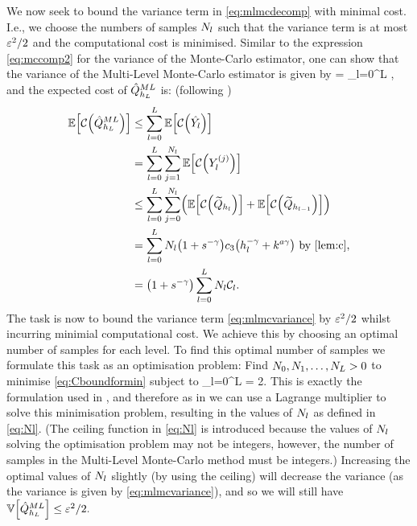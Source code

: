 We now seek to bound the variance term in \cref{eq:mlmcdecomp} with minimal cost. I.e., we choose the numbers of samples $N_{l}$ such that the variance term is at most $\varepsilon^2/2$ and the computational cost is minimised. Similar to the expression \cref{eq:mccomp2} for the variance of the Monte-Carlo estimator, one can show that the variance of the Multi-Level Monte-Carlo estimator is given by
\beq\label{eq:mlmcvariance}
\VAR{\QhatMLhL} = \sum_{l=0}^L \frac{\Vl}{\Nl},
\eeq
and the expected cost of $\hat{Q}^{ML}_{h_{L}}$ is: (following \cite{GrPaSc:19})
\begin{align}
\EXP{\Cost{\QhatMLhL}}&\leq \sum_{l=0}^L \EXP{\Cost{\Ylhat}}\nonumber\\
&= \sum_{l=0}^L \sum_{j=1}^{\Nl} \EXP{\Cost{\Ylj}}\nonumber\\
&\leq \sum_{l=0}^L \sum_{j=0}^{\Nl} \mleft(\EXP{\Cost{\Qhltilde}} + \EXP{\Cost{\Qhlmotilde}}\mright)\nonumber\\
&=\sum_{l=0}^L \Nl\mleft(1+s^{-\gamma}\mright) \cth \mleft(\hl^{-\gamma}+k^{a\gamma}\mright) \text{ by \cref{lem:c},}\nonumber\\
&= \mleft(1+s^{-\gamma}\mright) \sum_{l=0}^L \Nl\Cl.\label{eq:Cboundformin}
\end{align}
The task is now to bound the variance term \cref{eq:mlmcvariance} by $\varepsilon^2/2$ whilst incurring minimial computational cost. We achieve this by choosing an optimal number of samples for each level. To find this optimal number of samples we formulate this task as an optimisation problem:
Find $N_{0},N_{1},\ldots,N_{L} > 0$ to minimise \cref{eq:Cboundformin} subject to
\beqs
\sum_{l=0}^L \frac{\Vl}{\Nl} = 2.
\eeqs
This is exactly the formulation used in \cite[Section 1.3]{Gi:15}, and therefore as in \cite[Section 1.3]{Gi:15} we can use a Lagrange multiplier to solve this minimisation problem, resulting in the values of $N_{l}$ as defined in \cref{eq:Nl}. (The ceiling function in \cref{eq:Nl} is introduced because the values of $N_{l}$ solving the optimisation problem may not be integers, however, the number of samples in the Multi-Level Monte-Carlo method must be integers.) Increasing the optimal values of $N_{l}$ slightly (by using the ceiling) will decrease the variance (as the variance is given by \cref{eq:mlmcvariance}), and so we will still have $\VAR{\QhatMLhL} \leq \eps^2/2.$

